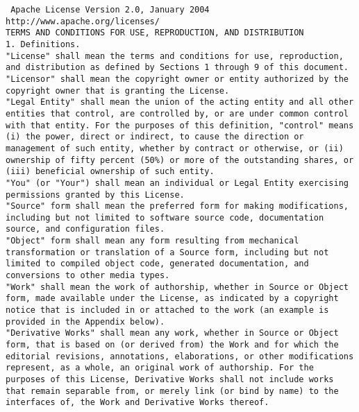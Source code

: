 \setlength{\baselineskip}{0.5\oldbaselineskip}
{\tiny\tt
\noindent
Apache License Version 2.0, January 2004
\\
http://www.apache.org/licenses/
\\[4pt]
TERMS AND CONDITIONS FOR USE, REPRODUCTION, AND DISTRIBUTION
\\[4pt]
1. Definitions.
\\[4pt]
"License" shall mean the terms and conditions for use, reproduction,
and distribution as defined by Sections 1 through 9 of this document.
\\[4pt]
"Licensor" shall mean the copyright owner or entity authorized by the
copyright owner that is granting the License.
\\[4pt]
"Legal Entity" shall mean the union of the acting entity and all other
entities that control, are controlled by, or are under common control
with that entity. For the purposes of this definition, "control" means
(i) the power, direct or indirect, to cause the direction or
management of such entity, whether by contract or otherwise, or (ii)
ownership of fifty percent (50\%) or more of the outstanding shares, or
(iii) beneficial ownership of such entity.
\\[4pt]
"You" (or "Your") shall mean an individual or Legal Entity exercising
permissions granted by this License.
\\[4pt]
"Source" form shall mean the preferred form for making modifications,
including but not limited to software source code, documentation
source, and configuration files.
\\[4pt]
"Object" form shall mean any form resulting from mechanical
transformation or translation of a Source form, including but not
limited to compiled object code, generated documentation, and
conversions to other media types.
\\[4pt]
"Work" shall mean the work of authorship, whether in Source or Object
form, made available under the License, as indicated by a copyright
notice that is included in or attached to the work (an example is
provided in the Appendix below).
\\[4pt]
"Derivative Works" shall mean any work, whether in Source or Object
form, that is based on (or derived from) the Work and for which the
editorial revisions, annotations, elaborations, or other modifications
represent, as a whole, an original work of authorship. For the
purposes of this License, Derivative Works shall not include works
that remain separable from, or merely link (or bind by name) to the
interfaces of, the Work and Derivative Works thereof.
}
